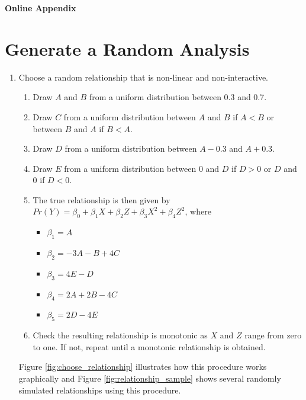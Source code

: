\documentclass[12pt]{article}
\begin{document}
\singlespace



\newpage
\begin{appendix}
\singlespace

\begin{center}
\LARGE{\textbf{Online Appendix}}\vspace{4mm}
\end{center}

\section*{Generate a Random Analysis}

\begin{enumerate}
\item Choose a random relationship that is non-linear and non-interactive.
        \begin{enumerate}
        \item Draw $A$ and $B$ from a uniform distribution between 0.3 and 0.7.
        \item Draw $C$ from a uniform distribution between $A$ and $B$ if $A < B$ or between $B$ and $A$ if $B < A$.
        \item Draw $D$ from a uniform distribution between $A - 0.3$ and $A + 0.3$.
        \item Draw $E$ from a uniform distribution between 0 and $D$ if $D > 0$ or $D$ and 0 if $D < 0$.
        \item The true relationship is then given by $Pr(Y) = \beta_0 + \beta_1X + \beta_2Z + \beta_3X^2 + \beta_4Z^2$, where
                \begin{itemize}
                \item $\beta_1 = A$
                \item $\beta_2 = -3A - B + 4C$ 
                \item $\beta_3 = 4E - D$
                \item $\beta_4 = 2A + 2B - 4C$
                \item $\beta_5 = 2D - 4E$ 
                \end{itemize}
        \item Check the resulting relationship is monotonic as $X$ and $Z$ range from zero to one. If not, repeat until a monotonic relationship is obtained.
        \end{enumerate}
        Figure \ref{fig:choose_relationship} illustrates how this procedure works graphically and Figure    \ref{fig:relationship_sample} shows several randomly simulated relationships using this procedure.




\end{enumerate}
\end{appendix}
\end{document}
